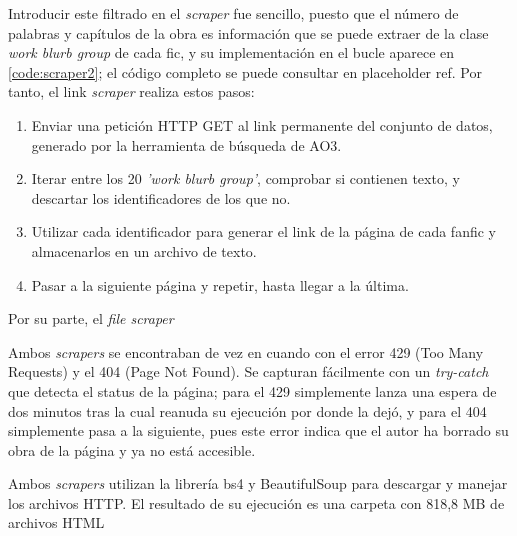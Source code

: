 \documentclass{pre-tfg}
\newcommand{\refToLinkScraperCode}{placeholder ref}
\begin{document}
Introducir este filtrado en el \textit{scraper} fue sencillo, puesto que el número de palabras y capítulos de la obra es información que se puede extraer de la clase \textit{work blurb group} de cada fic, y su implementación en el bucle aparece en \ref{code:scraper2}; el código completo se puede consultar en \refToLinkScraperCode. Por tanto, el link \textit{scraper} realiza estos pasos:
\begin{enumerate}
	\item Enviar una petición HTTP GET al link permanente del conjunto de datos, generado por la herramienta de búsqueda de AO3.
	\item Iterar entre los 20 \textit{'work blurb group'}, comprobar si contienen texto, y descartar los identificadores de los que no.
	\item Utilizar cada identificador para generar el link de la página de cada fanfic y almacenarlos en un archivo de texto.
	\item Pasar a la siguiente página y repetir, hasta llegar a la última.
\end{enumerate}


Por su parte, el \textit{file scraper}

Ambos \textit{scrapers} se encontraban de vez en cuando con el error 429 (Too Many Requests) y el 404 (Page Not Found). Se capturan fácilmente con un \textit{try-catch} que detecta el status de la página; para el 429 simplemente lanza una espera de dos minutos tras la cual reanuda su ejecución por donde la dejó, y para el 404 simplemente pasa a la siguiente, pues este error indica que el autor ha borrado su obra de la página y ya no está accesible.
 

Ambos \textit{scrapers} utilizan la librería bs4 y BeautifulSoup para descargar y manejar los archivos HTTP. El resultado de su ejecución es una carpeta con 818,8 MB de archivos HTML
\end{document}
